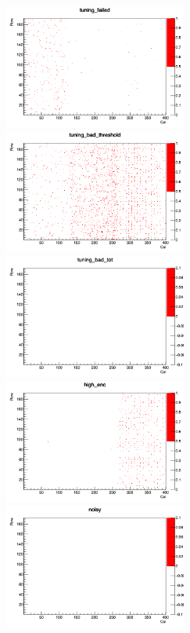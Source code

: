 \begin{figure}[bpt]
\begin{minipage}{0.45\hsize}
    \includegraphics[width=6.0cm]{./data/analysis_result/tuning_failed.png}
  \end{minipage}
  \begin{minipage}{0.45\hsize}
    \includegraphics[width=6.0cm]{./data/analysis_result/tuning_bad_threshold.png}
  \end{minipage}
  \begin{minipage}{0.45\hsize}
    \includegraphics[width=6.0cm]{./data/analysis_result/tuning_bad_tot.png}
  \end{minipage}
  \begin{minipage}{0.45\hsize}
    \includegraphics[width=6.0cm]{./data/analysis_result/high_enc.png}
  \end{minipage}
  \includegraphics[width=6.0cm]{./data/analysis_result/noisy.png}


\end{figure}
